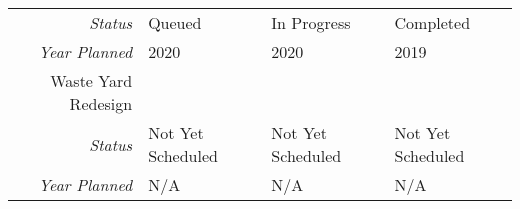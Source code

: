 \begin{tabularx}{\textwidth}{r|X|X|X|}
        \multicolumn{1}{|r|}{\cellcolor{ccorangelight}\textit{Status}}                & Queued                                                         & In Progress                                                         & Completed                                                         \\
        \multicolumn{1}{|r|}{\cellcolor{ccorangelight}\textit{Year Planned}}                  & 2020                                                     & 2020                                                     & 2019                                                     \\ \hline
\multicolumn{1}{|V{.2\columnwidth}|}{\cellcolor{ccorangelight}Waste Yard Redesign}          &                                                                  &                                                                  &                                                                  \\
        \multicolumn{1}{|r|}{\cellcolor{ccorangelight}\textit{Status}}                & Not Yet Scheduled                                                         & Not Yet Scheduled                                                         & Not Yet Scheduled                                                         \\
        \multicolumn{1}{|r|}{\cellcolor{ccorangelight}\textit{Year Planned}}                  & N/A                                                     & N/A                                                     & N/A                                                     \\ \hline
\end{tabularx}